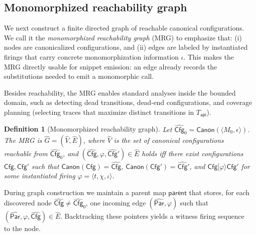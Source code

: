 \documentclass[sigconf]{acmart}
\newtheorem{definition}{Definition}
\begin{document}
\subsection{Monomorphized reachability graph}
\label{sec:analysis:mrg}
We next construct a finite directed graph of reachable canonical configurations. We call it the \emph{monomorphized reachability graph} (MRG) to emphasize that: (i) nodes are canonicalized configurations, and (ii) edges are labeled by instantiated firings that carry concrete monomorphization information $\iota$.
This makes the MRG directly usable for snippet emission:
an edge already records the substitutions needed to emit a monomorphic call.

Besides reachability, the MRG enables standard analyses inside the bounded domain, such as detecting dead transitions, dead-end configurations, and coverage planning (selecting traces that maximize distinct transitions in $T_{\mathsf{api}}$).

\begin{definition}[Monomorphized reachability graph]
\label{def:mrg}
Let $\widehat{\mathsf{Cfg}}_0=\mathsf{Canon}(\langle M_0,\epsilon\rangle)$.
The MRG is $\widehat{G}=(\widehat{V},\widehat{E})$, where $\widehat{V}$ is the set of
canonical configurations reachable from $\widehat{\mathsf{Cfg}}_0$, and
$(\widehat{\mathsf{Cfg}},\varphi,\widehat{\mathsf{Cfg}}')\in \widehat{E}$ holds iff there exist configurations
$\mathsf{Cfg},\mathsf{Cfg}'$ such that
$\mathsf{Canon}(\mathsf{Cfg})=\widehat{\mathsf{Cfg}}$,
$\mathsf{Canon}(\mathsf{Cfg}')=\widehat{\mathsf{Cfg}}'$,
and $\mathsf{Cfg}[\varphi\rangle \mathsf{Cfg}'$ for some instantiated firing $\varphi=\langle t,\chi,\iota\rangle$.
\end{definition}

During graph construction we maintain a parent map $\mathsf{parent}$ that stores, for each discovered node
$\widehat{\mathsf{Cfg}}\neq \widehat{\mathsf{Cfg}}_0$, one incoming edge $(\widehat{\mathsf{Par}},\varphi)$ such that
$(\widehat{\mathsf{Par}},\varphi,\widehat{\mathsf{Cfg}})\in\widehat{E}$.
Backtracking these pointers yields a witness firing sequence to the node.
\end{document}
